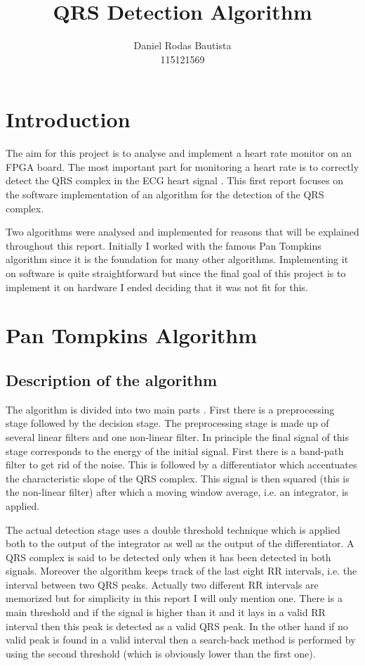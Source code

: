 \documentclass{article}
\title{QRS Detection Algorithm}
\author{Daniel Rodas Bautista\\
115121569}
\begin{document}
\maketitle

\section{Introduction}
The aim for this project is to analyse and implement a heart rate monitor on an FPGA board. The most important part for monitoring a heart rate is to correctly detect the QRS complex in the ECG heart signal \cite{principles}. This first report focuses on the software implementation of an algorithm for the detection of the QRS complex. 

Two algorithms were analysed and implemented for reasons that will be explained throughout this report. Initially I worked with the famous Pan Tompkins algorithm since it is the foundation for many other algorithms. Implementing it on software is quite straightforward but since the final goal of this project is to implement it on hardware I ended deciding that it was not fit for this. 

\section{Pan Tompkins Algorithm}

\subsection{Description of the algorithm}

The algorithm is divided into two main parts \cite{pan}. First there is a preprocessing stage followed by the decision stage. The preprocessing stage is made up of several linear filters and one non-linear filter. In principle the final signal of this stage corresponds to the energy of the initial signal. First there is a band-path filter to get rid of the noise. This is followed by a differentiator which accentuates the characteristic  slope of the QRS complex. This signal is then squared (this is the non-linear filter) after which a moving window average, i.e. an integrator, is applied. 

The actual detection stage uses a double threshold technique which is applied both to the output of the integrator as well as the output of the differentiator. A QRS complex is said to be detected only when it has been detected in both signals. Moreover the algorithm keeps track of the last eight RR intervals, i.e. the interval between two QRS peaks. Actually two different RR intervals are memorized but for simplicity in this report I will only mention one. There is a main threshold and if the signal is higher than it and it lays in a valid RR interval then this peak is detected as a valid QRS peak. In the other hand if no valid peak is found in a valid interval then a search-back method is performed by using the second threshold (which is obviously lower than the first one). 
\end{document}
